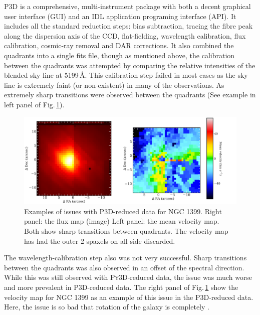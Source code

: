 		\textsc{P3D} is a comprehensive, multi-instrument package with both a decent graphical user interface (GUI) and an \textsc{IDL} application programing interface (API). It includes all the standard reduction steps: bias subtraction, tracing the fibre peak along the dispersion axis of the CCD, flat-fielding, wavelength calibration, flux calibration, cosmic-ray removal and DAR corrections. It also combined the quadrants into a single fits file, though as mentioned above, the calibration between the quadrants was attempted by comparing the relative intensities of the blended sky line at 5199\,\AA. This calibration step failed in most cases as the sky line is extremely faint (or non-existent) in many of the observations. As extremely sharp transitions were observed between the quadrants (See example in left panel of Fig.\,\ref{fig:P3D}). 

		\begin{figure}
			\centering
			\includegraphics[width=.9\textwidth]{chapter2/P3D_NGC1399.png}
			\caption[Demonstrating issues with \textsc{P3D}-reduced data]{Examples of issues with \textsc{P3D}-reduced data for NGC 1399. Right panel: the flux map (image) Left panel: the mean velocity map. Both show sharp transitions between quadrants. The velocity map has had the outer 2 spaxels on all side discarded.}
			\label{fig:P3D}
		\end{figure}


		The wavelength-calibration step also was not very successful. Sharp transitions between the quadrants was also observed in an offset of the spectral direction. While this was still observed with \textsc{Py3D}-reduced data, the issue was much worse and more prevalent in \textsc{P3D}-reduced data. The right panel of Fig.\,\ref{fig:P3D} show the velocity map for NGC 1399 as an example of this issue in the \textsc{P3D}-reduced data. Here, the issue is so bad that rotation of the galaxy is completely .

		






